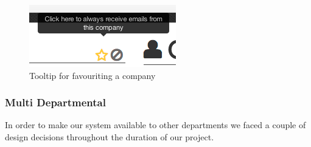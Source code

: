     \begin{figure}[H]\centering
    \includegraphics[scale=0.5]{images/design/company_star}
    \caption{Tooltip for favouriting a company}
    \end{figure}

  \subsubsection{Multi Departmental}
    In order to make our system available to other departments we faced a couple of design decisions throughout the duration of our project.
